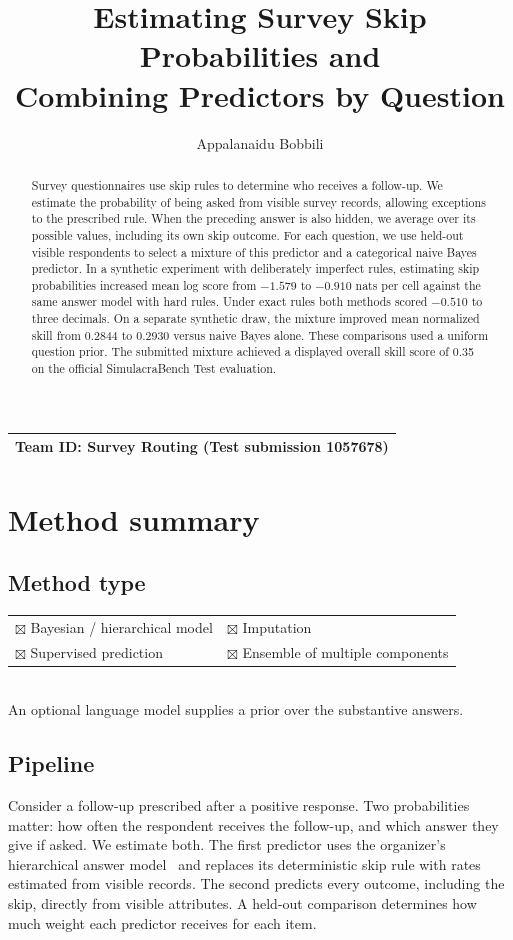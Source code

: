 \documentclass{article}
\title{Estimating Survey Skip Probabilities and\\Combining Predictors by Question}
\author{Appalanaidu Bobbili}
\begin{document}
\maketitle
\begin{center}\small\begin{tabular}{l}\toprule
\textbf{Team ID:} Survey Routing \quad (Test submission 1057678)\\\bottomrule
\end{tabular}\end{center}

\begin{abstract}
Survey questionnaires use skip rules to determine who receives a follow-up.
We estimate the probability of being asked from visible survey records, allowing
exceptions to the prescribed rule. When the preceding answer is also hidden, we
average over its possible values, including its own skip outcome. For each
question, we use held-out visible respondents to select a mixture of this
predictor and a categorical naive Bayes predictor. In a synthetic experiment
with deliberately imperfect rules, estimating skip probabilities increased
mean log score from $-1.579$ to $-0.910$ nats per cell against the same answer
model with hard rules. Under exact rules both methods scored $-0.510$ to three
decimals. On a separate synthetic draw, the mixture improved mean normalized
skill from 0.2844 to 0.2930 versus naive Bayes alone. These comparisons used
a uniform question prior. The submitted mixture achieved a displayed overall
skill score of 0.35 on the official SimulacraBench Test evaluation.
\end{abstract}

\section{Method summary}
\subsection{Method type}
\begin{tabular}{@{}ll@{}}
$\boxtimes$ Bayesian / hierarchical model & $\boxtimes$ Imputation\\
$\boxtimes$ Supervised prediction & $\boxtimes$ Ensemble of multiple components\\
\end{tabular}\\[3pt]
An optional language model supplies a prior over the substantive answers.

\subsection{Pipeline}
Consider a follow-up prescribed after a positive response. Two probabilities
matter: how often the respondent receives the follow-up, and which answer they
give if asked. We estimate both. The first predictor uses the organizer's
hierarchical answer model~\cite{starter} and replaces its deterministic skip
rule with rates estimated from visible records. The second predicts every
outcome, including the skip, directly from visible attributes. A held-out
comparison determines how much weight each predictor receives for each item.
\end{document}
